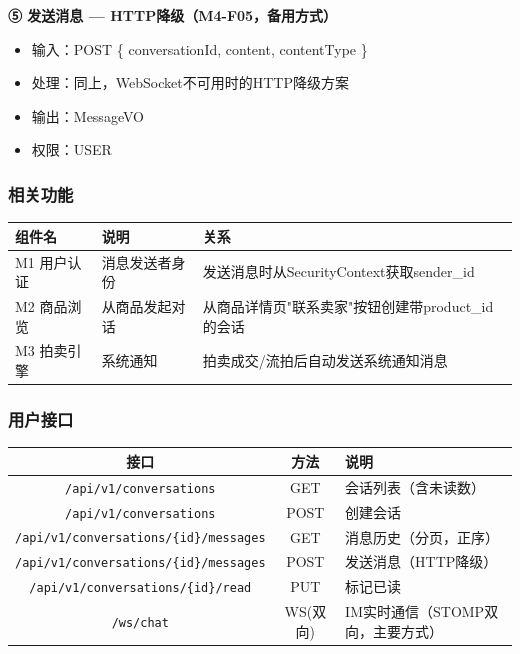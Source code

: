 \documentclass[12pt,a4paper]{ctexart}
\numberwithin{figure}{section}
\numberwithin{table}{section}
\begin{document}
\textbf{⑤ 发送消息 --- HTTP降级（M4-F05，备用方式）}

\begin{itemize}
    \item 输入：POST \{ conversationId, content, contentType \}
    \item 处理：同上，WebSocket不可用时的HTTP降级方案
    \item 输出：MessageVO
    \item 权限：USER
\end{itemize}

\subsubsection{相关功能}

\begin{center}
\renewcommand{\arraystretch}{1.3}
\begin{tabular}{|p{3cm}|p{4cm}|p{7cm}|}
\hline
\rowcolor{tableheader}
\textbf{组件名} & \textbf{说明} & \textbf{关系} \\
\hline
M1 用户认证 & 消息发送者身份 & 发送消息时从SecurityContext获取sender\_id \\
\hline
M2 商品浏览 & 从商品发起对话 & 从商品详情页"联系卖家"按钮创建带product\_id的会话 \\
\hline
M3 拍卖引擎 & 系统通知 & 拍卖成交/流拍后自动发送系统通知消息 \\
\hline
\end{tabular}
\end{center}

\subsubsection{用户接口}

\begin{center}
\renewcommand{\arraystretch}{1.3}
\begin{tabular}{|c|c|p{6cm}|}
\hline
\rowcolor{tableheader}
\textbf{接口} & \textbf{方法} & \textbf{说明} \\
\hline
\verb|/api/v1/conversations| & GET & 会话列表（含未读数） \\
\hline
\verb|/api/v1/conversations| & POST & 创建会话 \\
\hline
\verb|/api/v1/conversations/{id}/messages| & GET & 消息历史（分页，正序） \\
\hline
\verb|/api/v1/conversations/{id}/messages| & POST & 发送消息（HTTP降级） \\
\hline
\verb|/api/v1/conversations/{id}/read| & PUT & 标记已读 \\
\hline
\verb|/ws/chat| & WS(双向) & IM实时通信（STOMP双向，主要方式） \\
\hline
\end{tabular}
\end{center}
\end{document}
